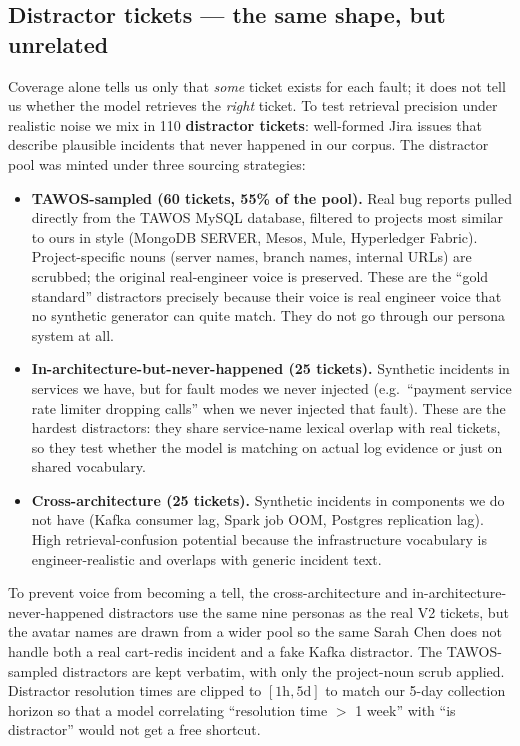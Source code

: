 \subsection{Distractor tickets --- the same shape, but unrelated}

Coverage alone tells us only that \emph{some} ticket exists for each fault; it does not tell us whether the model retrieves the \emph{right} ticket. To test retrieval precision under realistic noise we mix in 110 \textbf{distractor tickets}: well-formed Jira issues that describe plausible incidents that never happened in our corpus. The distractor pool was minted under three sourcing strategies:

\begin{itemize}
\item \textbf{TAWOS-sampled (60 tickets, 55\% of the pool).} Real bug reports pulled directly from the TAWOS MySQL database, filtered to projects most similar to ours in style (MongoDB SERVER, Mesos, Mule, Hyperledger Fabric). Project-specific nouns (server names, branch names, internal URLs) are scrubbed; the original real-engineer voice is preserved. These are the ``gold standard'' distractors precisely because their voice is real engineer voice that no synthetic generator can quite match. They do not go through our persona system at all.
\item \textbf{In-architecture-but-never-happened (25 tickets).} Synthetic incidents in services we have, but for fault modes we never injected (e.g.\ ``payment service rate limiter dropping calls'' when we never injected that fault). These are the hardest distractors: they share service-name lexical overlap with real tickets, so they test whether the model is matching on actual log evidence or just on shared vocabulary.
\item \textbf{Cross-architecture (25 tickets).} Synthetic incidents in components we do not have (Kafka consumer lag, Spark job OOM, Postgres replication lag). High retrieval-confusion potential because the infrastructure vocabulary is engineer-realistic and overlaps with generic incident text.
\end{itemize}

To prevent voice from becoming a tell, the cross-architecture and in-architecture-never-happened distractors use the same nine personas as the real V2 tickets, but the avatar names are drawn from a wider pool so the same Sarah Chen does not handle both a real cart-redis incident and a fake Kafka distractor. The TAWOS-sampled distractors are kept verbatim, with only the project-noun scrub applied. Distractor resolution times are clipped to $[1\text{h}, 5\text{d}]$ to match our 5-day collection horizon so that a model correlating ``resolution time $>$ 1 week'' with ``is distractor'' would not get a free shortcut.

